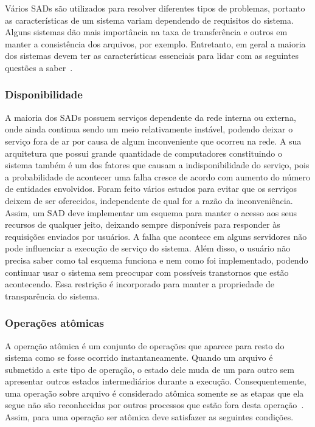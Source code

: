 	Vários SADs são utilizados para resolver diferentes tipos de problemas, portanto as características de um sistema variam dependendo de requisitos do sistema. Alguns sistemas dão mais importância na taxa de transferência e outros em manter a consistência dos arquivos, por exemplo. Entretanto, em geral a maioria dos sistemas devem ter as características essenciais para lidar com as seguintes questões a saber~\cite{tanenbaum07,coulouris06, galli00, kon94}.
	
	\subsubsection{Disponibilidade}
	A maioria dos SADs possuem serviços dependente da rede interna ou externa, onde ainda continua sendo um meio relativamente instável, podendo deixar o serviço fora de ar por causa de algum inconveniente que ocorreu na rede. A sua arquitetura que possui grande quantidade de computadores constituindo o sistema também é um dos fatores que causam a indisponibilidade do serviço, pois a probabilidade de acontecer uma falha cresce de acordo com aumento do número de entidades envolvidos. Foram feito vários estudos para evitar que os serviços deixem de ser oferecidos, independente de qual for a razão da inconveniência. Assim, um SAD deve implementar um esquema para manter o acesso aos seus recursos de qualquer jeito, deixando sempre disponíveis para responder às requisições enviados por usuários. A falha que acontece em alguns servidores não pode influenciar a execução de serviço do sistema. Além disso, o usuário não precisa saber como tal esquema funciona e nem como foi implementado, podendo continuar usar o sistema sem preocupar com possíveis transtornos que estão acontecendo. Essa restrição é incorporado para manter a propriedade de transparência do sistema.
	
	\subsubsection{Operações atômicas}
	A operação atômica é um conjunto de operações que aparece para resto do sistema como se fosse ocorrido instantaneamente.
	Quando um arquivo é submetido a este tipo de operação, o estado dele muda de um para outro sem apresentar outros estados intermediários durante a execução.
	Consequentemente, uma operação sobre arquivo é considerado atômica somente se as etapas que ela segue não são reconhecidas por outros processos que estão fora desta operação~\cite{tanenbaum07_2}. 
	Assim, para uma operação ser atômica deve satisfazer as seguintes condições.
	
